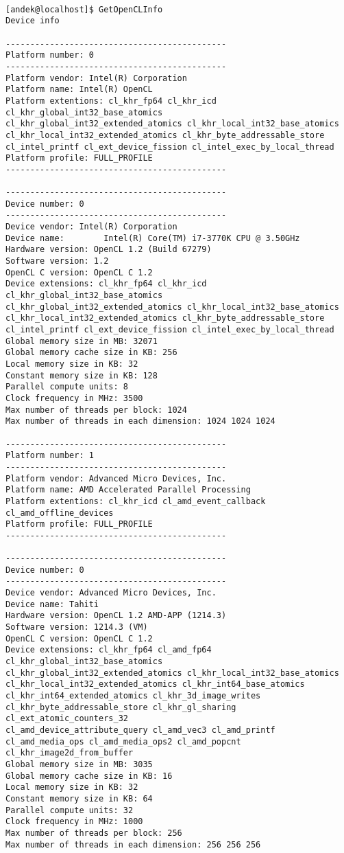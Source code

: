 \begin{verbatim}

[andek@localhost]$ GetOpenCLInfo 
Device info 
 
---------------------------------------------
Platform number: 0
---------------------------------------------
Platform vendor: Intel(R) Corporation
Platform name: Intel(R) OpenCL
Platform extentions: cl_khr_fp64 cl_khr_icd cl_khr_global_int32_base_atomics 
cl_khr_global_int32_extended_atomics cl_khr_local_int32_base_atomics 
cl_khr_local_int32_extended_atomics cl_khr_byte_addressable_store 
cl_intel_printf cl_ext_device_fission cl_intel_exec_by_local_thread 
Platform profile: FULL_PROFILE
---------------------------------------------

---------------------------------------------
Device number: 0
---------------------------------------------
Device vendor: Intel(R) Corporation
Device name:        Intel(R) Core(TM) i7-3770K CPU @ 3.50GHz
Hardware version: OpenCL 1.2 (Build 67279)
Software version: 1.2
OpenCL C version: OpenCL C 1.2 
Device extensions: cl_khr_fp64 cl_khr_icd cl_khr_global_int32_base_atomics 
cl_khr_global_int32_extended_atomics cl_khr_local_int32_base_atomics 
cl_khr_local_int32_extended_atomics cl_khr_byte_addressable_store 
cl_intel_printf cl_ext_device_fission cl_intel_exec_by_local_thread 
Global memory size in MB: 32071
Global memory cache size in KB: 256
Local memory size in KB: 32
Constant memory size in KB: 128
Parallel compute units: 8
Clock frequency in MHz: 3500
Max number of threads per block: 1024
Max number of threads in each dimension: 1024 1024 1024

---------------------------------------------
Platform number: 1
---------------------------------------------
Platform vendor: Advanced Micro Devices, Inc.
Platform name: AMD Accelerated Parallel Processing
Platform extentions: cl_khr_icd cl_amd_event_callback cl_amd_offline_devices
Platform profile: FULL_PROFILE
---------------------------------------------

---------------------------------------------
Device number: 0
---------------------------------------------
Device vendor: Advanced Micro Devices, Inc.
Device name: Tahiti
Hardware version: OpenCL 1.2 AMD-APP (1214.3)
Software version: 1214.3 (VM)
OpenCL C version: OpenCL C 1.2 
Device extensions: cl_khr_fp64 cl_amd_fp64 cl_khr_global_int32_base_atomics 
cl_khr_global_int32_extended_atomics cl_khr_local_int32_base_atomics 
cl_khr_local_int32_extended_atomics cl_khr_int64_base_atomics 
cl_khr_int64_extended_atomics cl_khr_3d_image_writes 
cl_khr_byte_addressable_store cl_khr_gl_sharing cl_ext_atomic_counters_32 
cl_amd_device_attribute_query cl_amd_vec3 cl_amd_printf 
cl_amd_media_ops cl_amd_media_ops2 cl_amd_popcnt cl_khr_image2d_from_buffer 
Global memory size in MB: 3035
Global memory cache size in KB: 16
Local memory size in KB: 32
Constant memory size in KB: 64
Parallel compute units: 32
Clock frequency in MHz: 1000
Max number of threads per block: 256
Max number of threads in each dimension: 256 256 256


\end{verbatim}
